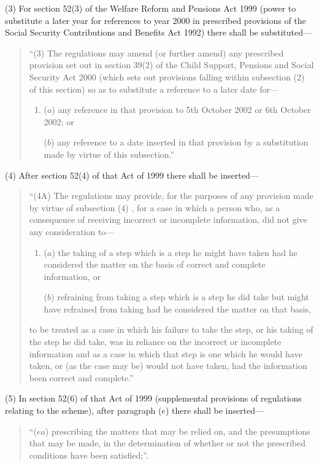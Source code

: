 \documentclass[12pt,a4paper]{article}
\begin{document}
(3) For section 52(3)  of the Welfare Reform and Pensions Act 1999 (power to substitute a later year for references to year 2000 in prescribed provisions of the Social Security Contributions and Benefits Act 1992) there shall be substituted—
\begin{quotation}
“(3) The regulations may amend (or further amend) any prescribed provision set out in section 39(2)  of the Child Support, Pensions and Social Security Act 2000 (which sets out provisions falling within subsection (2)  of this section) so as to substitute a reference to a later date for—
\begin{enumerate}\item[]
($a$) any reference in that provision to 5th October 2002 or 6th October 2002; or

($b$) any reference to a date inserted in that provision by a substitution made by virtue of this subsection.”
\end{enumerate}
\end{quotation}

(4) After section 52(4)  of that Act of 1999 there shall be inserted—
\begin{quotation}
“(4A) The regulations may provide, for the purposes of any provision made by virtue of subsection (4) , for a case in which a person who, as a consequence of receiving incorrect or incomplete information, did not give any consideration to—
\begin{enumerate}\item[]
($a$) the taking of a step which is a step he might have taken had he considered the matter on the basis of correct and complete information, or

($b$) refraining from taking a step which is a step he did take but might have refrained from taking had he considered the matter on that basis,
\end{enumerate}
to be treated as a case in which his failure to take the step, or his taking of the step he did take, was in reliance on the incorrect or incomplete information and as a case in which that step is one which he would have taken, or (as the case may be) would not have taken, had the information been correct and complete.”
\end{quotation}

(5) In section 52(6)  of that Act of 1999 (supplemental provisions of regulations relating to the scheme), after paragraph ($e$)  there shall be inserted—
\begin{quotation}
“($ea$) prescribing the matters that may be relied on, and the presumptions that may be made, in the determination of whether or not the prescribed conditions have been satisfied;”.
\end{quotation}
\end{document}
